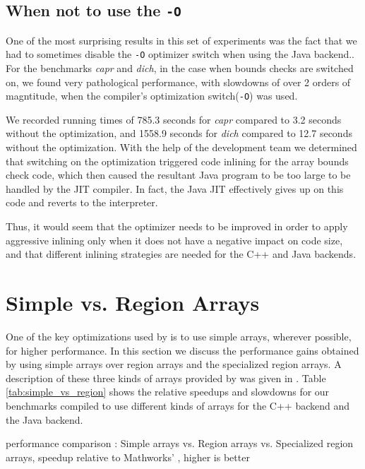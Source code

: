 \subsection{When not to use the \xten \texttt{-O}}
\label{sec:BOOM}

One of the most surprising results in this set of experiments was the fact that
we had to sometimes disable the \xten \texttt{-O} optimizer switch when
using the \xten Java backend..
For the benchmarks \emph{capr} and
\emph{dich}, in the case when \xten bounds checks are switched on, we found
very pathological performance, with slowdowns of over 2 orders of magntitude,
when the \xten compiler's optimization switch(\texttt{-O}) was used.

We recorded running times of 785.3 seconds for \emph{capr} compared to 3.2
seconds without the optimization, and 1558.9 seconds for \emph{dich} compared to
12.7 seconds without the optimization.  With the help of the \xten development
team we determined that switching on the optimization triggered code inlining
for the array bounds check code, which then
caused the resultant Java program to be too large to be handled by the JIT
compiler.  In fact, the Java JIT effectively gives up on this code and reverts 
to the interpreter. 

Thus, it would seem that the \xten optimizer needs to be improved in order to
apply aggressive inlining only when it does not have a negative impact on code
size,  and that different inlining strategies are needed for the C++ and Java
backends.

\section{Simple vs. Region Arrays} \label{sec:EvalArrays}

One of the key optimizations used by \mixten is to use simple arrays,
wherever possible, for higher performance.  In this section we discuss the
performance gains obtained by using simple arrays over region arrays and
the specialized region arrays.  A description of these three kinds of arrays
provided by \xten was given in .  Table
\ref{tab:simple_vs_region} shows the relative speedups and slowdowns for our
benchmarks compiled to use different kinds of \xten arrays for the C++ backend
and the Java backend.

\begin{table}[htbp]
\begin{center} 
\scalebox{0.67}{

}
\caption{\mixten performance comparison : Simple
arrays vs. Region arrays vs.  Specialized region arrays, speedup relative to 
Mathworks' \matlab, higher is better} 
\label{tab:simple_vs_region} 
\end{center}
\end{table}


